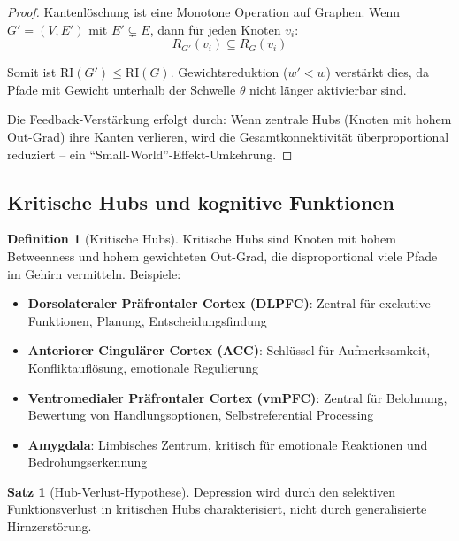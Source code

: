 \documentclass[a4paper,12pt]{article}
\theoremstyle{definition}
\newtheorem{definition}{Definition}
\newtheorem{satz}{Satz}
\begin{document}
\begin{proof}
Kantenlöschung ist eine Monotone Operation auf Graphen. Wenn $G' = (V, E')$ mit $E' \subsetneq E$, dann für jeden Knoten $v_i$:
\[
R_{G'}(v_i) \subseteq R_G(v_i)
\]

Somit ist $\text{RI}(G') \leq \text{RI}(G)$. Gewichtsreduktion ($w' < w$) verstärkt dies, da Pfade mit Gewicht unterhalb der Schwelle $\theta$ nicht länger aktivierbar sind.

Die Feedback-Verstärkung erfolgt durch: Wenn zentrale Hubs (Knoten mit hohem Out-Grad) ihre Kanten verlieren, wird die Gesamtkonnektivität überproportional reduziert -- ein ``Small-World''-Effekt-Umkehrung.
\end{proof}

\subsection{Kritische Hubs und kognitive Funktionen}

\begin{definition}[Kritische Hubs]
Kritische Hubs sind Knoten mit hohem Betweenness und hohem gewichteten Out-Grad, die disproportional viele Pfade im Gehirn vermitteln. Beispiele:

\begin{itemize}
	\item \textbf{Dorsolateraler Präfrontaler Cortex (DLPFC)}: Zentral für exekutive Funktionen, Planung, Entscheidungsfindung
	\item \textbf{Anteriorer Cingulärer Cortex (ACC)}: Schlüssel für Aufmerksamkeit, Konfliktauflösung, emotionale Regulierung
	\item \textbf{Ventromedialer Präfrontaler Cortex (vmPFC)}: Zentral für Belohnung, Bewertung von Handlungsoptionen, Selbstreferential Processing
	\item \textbf{Amygdala}: Limbisches Zentrum, kritisch für emotionale Reaktionen und Bedrohungserkennung
\end{itemize}
\end{definition}

\begin{satz}[Hub-Verlust-Hypothese]
Depression wird durch den selektiven Funktionsverlust in kritischen Hubs charakterisiert, nicht durch generalisierte Hirnzerstörung.
\end{satz}
\end{document}
